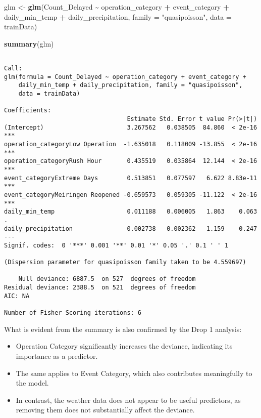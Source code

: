 \documentclass[
]{article}
\newenvironment{Shaded}{\begin{snugshade}}{\end{snugshade}}
\newcommand{\AttributeTok}[1]{\textcolor[rgb]{0.13,0.29,0.53}{#1}}
\newcommand{\FunctionTok}[1]{\textcolor[rgb]{0.13,0.29,0.53}{\textbf{#1}}}
\newcommand{\NormalTok}[1]{#1}
\newcommand{\OtherTok}[1]{\textcolor[rgb]{0.56,0.35,0.01}{#1}}
\newcommand{\SpecialCharTok}[1]{\textcolor[rgb]{0.81,0.36,0.00}{\textbf{#1}}}
\newcommand{\StringTok}[1]{\textcolor[rgb]{0.31,0.60,0.02}{#1}}
\begin{document}
\begin{Shaded}
\begin{Highlighting}[]
\NormalTok{glm }\OtherTok{\textless{}{-}} \FunctionTok{glm}\NormalTok{(Count\_Delayed }\SpecialCharTok{\textasciitilde{}}\NormalTok{ operation\_category }\SpecialCharTok{+}\NormalTok{ event\_category }\SpecialCharTok{+}\NormalTok{ daily\_min\_temp }\SpecialCharTok{+}\NormalTok{ daily\_precipitation,}
\AttributeTok{family =} \StringTok{"quasipoisson"}\NormalTok{, }\AttributeTok{data =}\NormalTok{ trainData)}

\FunctionTok{summary}\NormalTok{(glm)}
\end{Highlighting}
\end{Shaded}

\begin{verbatim}

Call:
glm(formula = Count_Delayed ~ operation_category + event_category + 
    daily_min_temp + daily_precipitation, family = "quasipoisson", 
    data = trainData)

Coefficients:
                                  Estimate Std. Error t value Pr(>|t|)    
(Intercept)                       3.267562   0.038505  84.860  < 2e-16 ***
operation_categoryLow Operation  -1.635018   0.118009 -13.855  < 2e-16 ***
operation_categoryRush Hour       0.435519   0.035864  12.144  < 2e-16 ***
event_categoryExtreme Days        0.513851   0.077597   6.622 8.83e-11 ***
event_categoryMeiringen Reopened -0.659573   0.059305 -11.122  < 2e-16 ***
daily_min_temp                    0.011188   0.006005   1.863    0.063 .  
daily_precipitation               0.002738   0.002362   1.159    0.247    
---
Signif. codes:  0 '***' 0.001 '**' 0.01 '*' 0.05 '.' 0.1 ' ' 1

(Dispersion parameter for quasipoisson family taken to be 4.559697)

    Null deviance: 6887.5  on 527  degrees of freedom
Residual deviance: 2388.5  on 521  degrees of freedom
AIC: NA

Number of Fisher Scoring iterations: 6
\end{verbatim}

What is evident from the summary is also confirmed by the Drop 1
analysis:

\begin{itemize}
\item
  Operation Category significantly increases the deviance, indicating
  its importance as a predictor.
\item
  The same applies to Event Category, which also contributes
  meaningfully to the model.
\item
  In contrast, the weather data does not appear to be useful predictors,
  as removing them does not substantially affect the deviance.
\end{itemize}
\end{document}

